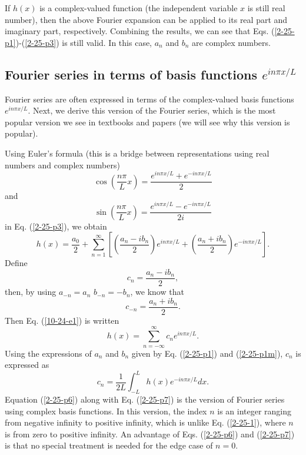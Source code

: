 \documentclass{article}
\begin{document}
If $h (x)$ is a complex-valued function (the independent variable $x$ is still
real number), then the above Fourier expansion can be applied to its real part
and imaginary part, respectively. Combining the results, we can see that Eqs.
(\ref{2-25-p1})-(\ref{2-25-p3}) is still valid. In this case, $a_n$ and $b_n$
are complex numbers.

\subsection{Fourier series in terms of basis functions $e^{i n \pi x / L}$}

Fourier series are often expressed in terms of the complex-valued basis
functions $e^{i n \pi x / L}$. Next, we derive this version of the Fourier
series, which is the most popular version we see in textbooks and papers (we
will see why this version is popular).

Using Euler's formula (this is a bridge between representations using real
numbers and complex numbers)
\begin{equation}
  \cos \left( \frac{n \pi}{L} x \right) = \frac{e^{i n \pi x / L} + e^{- i n
  \pi x / L}}{2}
\end{equation}
and
\begin{equation}
  \sin \left( \frac{n \pi}{L} x \right) = \frac{e^{i n \pi x / L} - e^{- i n
  \pi x / L}}{2 i}
\end{equation}
in Eq. (\ref{2-25-p3}), we obtain
\begin{equation}
  \label{10-24-e1} h (x) = \frac{a_0}{2} + \sum_{n = 1}^{\infty} \left[ \left(
  \frac{a_n - i b_n}{2} \right) e^{i n \pi x / L} + \left( \frac{a_n + i
  b_n}{2} \right) e^{- i n \pi x / L} \right] .
\end{equation}
Define
\begin{equation}
  \label{2-25-p4} c_n = \frac{a_n - i b_n}{2},
\end{equation}
then, by using $a_{- n} = a_n$ $b_{- n} = - b_n$, we know that
\begin{equation}
  c_{- n} = \frac{a_n + i b_n}{2} .
\end{equation}
Then Eq. (\ref{10-24-e1}) is written
\begin{equation}
  \label{2-25-p6} h (x) = \sum_{n = - \infty}^{\infty} c_n e^{i n \pi x / L} .
\end{equation}
Using the expressions of $a_n$ and $b_n$ given by Eq. (\ref{2-25-p1}) and
(\ref{2-25-p1m}), $c_n$ is expressed as
\begin{equation}
  \label{2-25-p7} c_n = \frac{1}{2 L} \int_{- L}^L h (x) e^{- i n \pi x / L} d
  x.
\end{equation}
Equation (\ref{2-25-p6}) along with Eq. (\ref{2-25-p7}) is the version of
Fourier series using complex basis functions. In this version, the index $n$
is an integer ranging from negative infinity to positive infinity, which is
unlike Eq. (\ref{2-25-1}), where $n$ is from zero to positive infinity. An
advantage of Eqs. (\ref{2-25-p6}) and (\ref{2-25-p7}) is that no special
treatment is needed for the edge case of $n = 0$.
\end{document}
